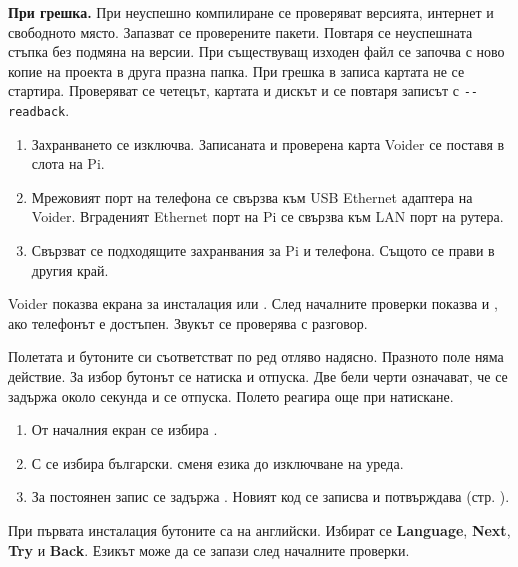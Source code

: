 \textbf{При грешка.} При неуспешно компилиране се проверяват версията, интернет и свободното място. Запазват се проверените пакети. Повтаря се неуспешната стъпка без подмяна на версии. При съществуващ изходен файл се започва с ново копие на проекта в друга празна папка. При грешка в записа картата не се стартира. Проверяват се четецът, картата и дискът и се повтаря записът с \verb|--readback|.

\begin{enumerate}
\item Захранването се изключва. Записаната и проверена карта Voider се поставя в слота на Pi.
\item Мрежовият порт на телефона се свързва към USB Ethernet адаптера на Voider. Вграденият Ethernet порт на Pi се свързва към LAN порт на рутера.
\item Свързват се подходящите захранвания за Pi и телефона. Същото се прави в другия край.
\end{enumerate}
Voider показва екрана за инсталация или . След началните проверки  показва  и , ако телефонът е достъпен. Звукът се проверява с разговор.

Полетата и бутоните си съответстват по ред отляво надясно. Празното поле няма действие. За избор бутонът се натиска и отпуска. Две бели черти означават, че се задържа около секунда и се отпуска. Полето реагира още при натискане.
\begin{enumerate}
\item От началния екран се избира  \arr {} \arr {}.
\item С  се избира български.  сменя езика до изключване на уреда.
\item За постоянен запис се задържа . Новият код се записва и потвърждава (стр. \pageref{bg:check}).
\end{enumerate}
При първата инсталация бутоните са на английски. Избират се \textbf{Language}, \textbf{Next}, \textbf{Try} и \textbf{Back}. Езикът може да се запази след началните проверки.

